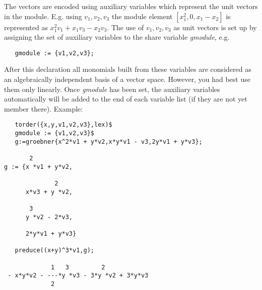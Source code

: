 The vectors are encoded using auxiliary variables which represent
the unit vectors in the module. E.g. using ${v_1,v_2,v_3}$ the
module element $[x_1^2,0,x_1-x_2]$ is represented as
$x_1^2 v_1 + x_1 v_3 - x_2 v_3$. The use of ${v_1,v_2,v_3}$
as unit vectors is set up by assigning the set of auxiliary variables
to the share variable \hypertarget{reserved:GMODULE}{\emph{gmodule}}, e.g.
\begin{verbatim}
   gmodule := {v1,v2,v3};
\end{verbatim}
After this declaration all monomials built from these variables
are considered as an algebraically independent basis of a vector
space. However, you had best use them only linearly. Once \emph{gmodule}
has been set, the auxiliary variables automatically will be
added to the end of each variable list (if they are not yet
member there).
Example:
\begin{verbatim}
   torder({x,y,v1,v2,v3},lex)$
   gmodule := {v1,v2,v3}$
   g:=groebner{x^2*v1 + y*v2,x*y*v1 - v3,2y*v1 + y*v3};

       2
g := {x *v1 + y*v2,

              2
      x*v3 + y *v2,

       3
      y *v2 - 2*v3,

      2*y*v1 + y*v3}

   preduce((x+y)^3*v1,g);

             1   3         2
 - x*y*v2 - ---*y *v3 - 3*y *v2 + 3*y*v3
             2
\end{verbatim}

